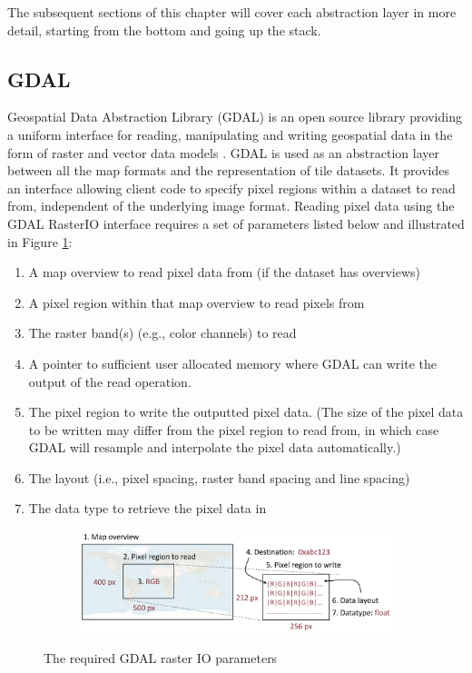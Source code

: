 The subsequent sections of this chapter will cover each abstraction layer in more detail, starting from the bottom and going up the stack.

\subsection{GDAL}
Geospatial Data Abstraction Library (GDAL) is an open source library providing a uniform interface for reading, manipulating and writing geospatial data in the form of raster and vector data models \cite{gdal}. GDAL is used as an abstraction layer between all the map formats and the representation of tile datasets. It provides an interface allowing client code to specify pixel regions within a dataset to read from, independent of the underlying image format. Reading pixel data using the GDAL RasterIO interface requires a set of parameters listed below and illustrated in Figure \ref{fig:gdalio}:

\begin{enumerate}
	\item A map overview to read pixel data from (if the dataset has overviews)
	\item A pixel region within that map overview to read pixels from
	\item The raster band(s) (e.g., color channels) to read
	\item A pointer to sufficient user allocated memory where GDAL can write the output of the read operation. 
	\item The pixel region to write the outputted pixel data. (The size of the pixel data to be written may differ from the pixel region to read from, in which case GDAL will resample and interpolate the pixel data automatically.)
	\item The layout (i.e., pixel spacing, raster band spacing and line spacing)
	\item The data type to retrieve the pixel data in
\end{enumerate}

\begin{figure}[htbp]
    \centering
    \begin{subfigure}[bt]{1.0\textwidth}
        \includegraphics[width=\textwidth]{figures/implementation/pipeline/gdalio.pdf}
    \end{subfigure}
    \caption{The required GDAL raster IO parameters}
    \label{fig:gdalio}
\end{figure}

